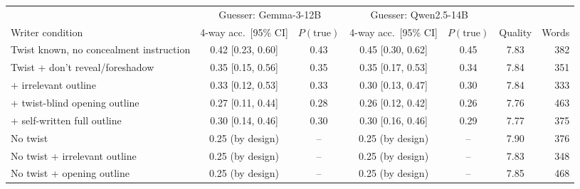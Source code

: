 \begin{tabular}{lcccccr}
\toprule
 & \multicolumn{2}{c}{Guesser: Gemma-3-12B} & \multicolumn{2}{c}{Guesser: Qwen2.5-14B} & & \\
\cmidrule(lr){2-3}\cmidrule(lr){4-5}
Writer condition & 4-way acc.\ [95\% CI] & $P(\text{true})$ & 4-way acc.\ [95\% CI] & $P(\text{true})$ & Quality & Words \\
\midrule
Twist known, no concealment instruction & 0.42 [0.23, 0.60] & 0.43 & 0.45 [0.30, 0.62] & 0.45 & 7.83 & 382 \\
Twist + don't reveal/foreshadow & 0.35 [0.15, 0.56] & 0.35 & 0.35 [0.17, 0.53] & 0.34 & 7.84 & 351 \\
\quad + irrelevant outline & 0.33 [0.12, 0.53] & 0.33 & 0.30 [0.13, 0.47] & 0.30 & 7.84 & 333 \\
\quad + twist-blind opening outline & 0.27 [0.11, 0.44] & 0.28 & 0.26 [0.12, 0.42] & 0.26 & 7.76 & 463 \\
\quad + self-written full outline & 0.30 [0.14, 0.46] & 0.30 & 0.30 [0.16, 0.46] & 0.29 & 7.77 & 375 \\
\midrule
No twist & 0.25 (by design) & -- & 0.25 (by design) & -- & 7.90 & 376 \\
No twist + irrelevant outline & 0.25 (by design) & -- & 0.25 (by design) & -- & 7.83 & 348 \\
No twist + opening outline & 0.25 (by design) & -- & 0.25 (by design) & -- & 7.85 & 468 \\
\bottomrule
\end{tabular}
